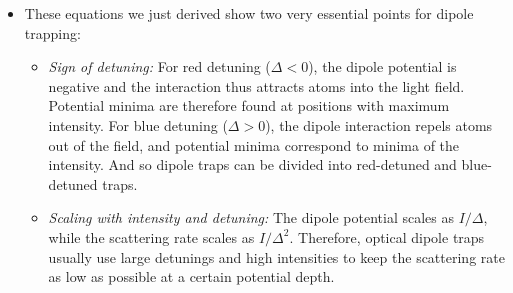 \documentclass{book}
\theoremstyle{definition}
\begin{document}
\begin{itemize}
\begin{itemize}
		
		\item These equations we just derived show two very essential points for dipole trapping:
		\begin{itemize}
			\item \textit{Sign of detuning:} For red detuning ($\Delta < 0$), the dipole potential is negative and the interaction thus attracts atoms into the light field. Potential minima are therefore found at positions with maximum intensity. For blue detuning ($\Delta > 0$), the dipole interaction repels atoms out of the field, and potential minima correspond to minima of the intensity. And so dipole traps can be divided into red-detuned and blue-detuned traps. 
			\item \textit{Scaling with intensity and detuning:} The dipole potential scales as $I/\Delta$, while the scattering rate scales as $I/\Delta^2$. Therefore, optical dipole traps usually use large detunings and high intensities to keep the scattering rate as low as possible at a certain potential depth.
		\end{itemize}
	

\end{itemize}
\end{itemize}
\end{document}

